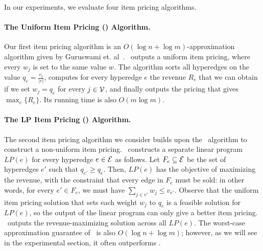 
In our experiments, we evaluate four item pricing algorithms.

\paragraph{The Uniform Item Pricing (\uip) Algorithm.}
Our first item pricing algorithm is an $O(\log n + \log m)$-approximation algorithm given by Guruswami et. al~\cite{guruswami2005profit}. \uip\ outputs a uniform item pricing,
where every $w_j$ is set to the same value $w$. The algorithm sorts all hyperedges on the value $q_e = \frac{v_e}{|e|}$, computes for every hyperedge $e$  
the revenue $R_e$ that we can obtain if we set $w_j = q_e$ for every $j \in \mathcal{V}$, and finally outputs the pricing that gives $\max_e \{ R_e\}$. Its running time is also $O(m \log m)$.


\paragraph{The LP Item Pricing (\lpip) Algorithm.}

The second item pricing algorithm we consider builds upon the \uip\ algorithm to construct a non-uniform item pricing. \lpip\ constructs a separate linear program $LP(e)$ for every hyperedge $e \in \mathcal{E}$ as follows. Let $F_e \subseteq \mathcal{E}$ be the set of hyperedges $e'$ such that $q_{e'} \geq q_{e}$. Then, $LP(e)$ has the objective of maximizing the revenue,
with the constraint that every edge in $F_e$ must be sold: in other words, for every $e' \in F_e$, we must have $\sum_{j \in e'} w_j \leq v_{e'}$. Observe that the uniform item pricing
solution that sets each weight $w_j$ to $q_e$ is a feasible solution for $LP(e)$, so the output of the linear program can only give a better item pricing. \lpip\ outputs the revenue-maximizing solution across all $LP(e)$. The worst-case approximation guarantee of \lpip\ is also $O(\log n + \log m)$; however, as we will see in the experimental section, it often outperforms \uip.

